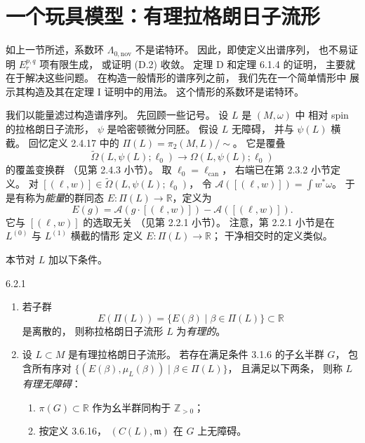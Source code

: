 
\section{一个玩具模型：有理拉格朗日子流形}
\label{sec:6-2}

如上一节所述，系数环
$\Lambda_{0,\mathrm{nov}}$ 不是诺特环。
因此，即使定义出谱序列，
也不易证明 $E_r^{p,q}$ 项有限生成，
或证明 (D.2) 收敛。
定理 D 和定理 6.1.4 的证明，
主要就在于解决这些问题。
在构造一般情形的谱序列之前，
我们先在一个简单情形中
展示其构造及其在定理 I 证明中的用法。
这个情形的系数环是诺特环。

我们以能量滤过构造谱序列。
先回顾一些记号。
设 $L$ 是 $(M,\omega)$ 中
相对 spin 的拉格朗日子流形，
$\psi$ 是哈密顿微分同胚。
假设 $L$ 无障碍，
并与 $\psi(L)$ 横截。
回忆定义 2.4.17 中的
$\Pi(L)=\pi_2(M,L)/\sim$。
它是覆叠
\[
\widetilde\Omega(L,\psi(L);\ell_0)
\longrightarrow
\Omega(L,\psi(L);\ell_0)
\]
的覆盖变换群
（见第 2.4.3 小节）。
取 $\ell_0=\ell_{\mathrm{can}}$，
右端已在第 2.3.2 小节定义。
对
$[(\ell,w)]\in
\widetilde\Omega(L,\psi(L);\ell_0)$，
令
$\mathcal A([(\ell,w)])=\int w^*\omega$。
于是有称为\emph{能量}的群同态
$E:\Pi(L)\to\mathbb R$，定义为
\[
E(g)=\mathcal A(g\cdot[(\ell,w)])
-\mathcal A([(\ell,w)]).
\]
它与 $[(\ell,w)]$ 的选取无关
（见第 2.2.1 小节）。
注意，第 2.2.1 小节是在
$L^{(0)}$ 与 $L^{(1)}$ 横截的情形
定义 $E:\Pi(L)\to\mathbb R$；
干净相交时的定义类似。

本节对 $L$ 加以下条件。

\begin{definition}{6.2.1}\label{def:6-2-1}
\begin{enumerate}[label=\textup{(6.2.2.\arabic*)},leftmargin=5.8em]
\item 若子群
\[
E(\Pi(L))
=\{E(\beta)\mid\beta\in\Pi(L)\}
\subset\mathbb R
\]
是离散的，
则称拉格朗日子流形 $L$ 为\emph{有理的}。
\item 设 $L\subset M$ 是有理拉格朗日子流形。
若存在满足条件 3.1.6 的子幺半群 $G$，
包含所有序对
$\{(E(\beta),\mu_L(\beta))
\mid\beta\in\Pi(L)\}$，
且满足以下两条，
则称 $L$ \emph{有理无障碍}：
\begin{enumerate}[label=\textup{(6.2.3.\arabic*)},leftmargin=5.8em]
\item $\pi(G)\subset\mathbb R$
作为幺半群同构于 $\mathbb Z_{>0}$；
\item 按定义 3.6.16，
$(C(L),\mathfrak m)$ 在 $G$ 上无障碍。
\end{enumerate}
\end{enumerate}
\end{definition}

